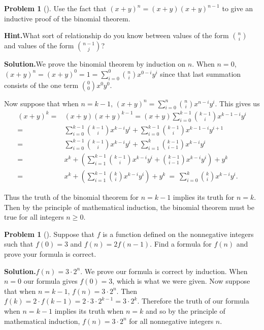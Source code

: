 \documentclass[10pt,]{book}
\theoremstyle{plain}
\theoremstyle{definition}
\newtheorem{activity}[project]{Problem}
\theoremstyle{definition}
\numberwithin{equation}{chapter}
\newcommand{\amp}{&}
\begin{document}
\begin{activity}[]\label{activity-73}
Use the fact that \((x+y)^n = (x+y)(x+y)^{n-1}\) to give an inductive proof of the binomial theorem.%
\par\medskip\noindent%
\textbf{Hint.}\quad What sort of relationship do you know between values of the form \(\binom{n}{i}\) and values of the form \(\binom{n-1}{j}\)?%
\par\medskip\noindent%
\textbf{Solution.}\quad We prove the binomial theorem by induction on \(n\). When \(n=0\), \((x+y)^n=(x+y)^0=1=\sum_{i=0}^0 \binom{n}{i}x^{0-i}y^i\) since that last summation consists of the one term \(\binom{0}{0}x^0y^0\).%
\par
Now suppose that when \(n=k-1\), \((x+y)^n=\sum_{i=0}^n \binom{n}{i}x^{n-i}y^i.\) This gives us%
\begin{align*}
(x+y)^k =\amp (x+y)(x+y)^{k-1}=(x+y)\sum_{i=0}^{k-1}\binom{k-1}{i}x^{k-1-i}y^i\\
=\amp \sum_{i=0}^{k-1}\binom{k-1}{i}x^{k-i}y^i+\sum_{i=0}^{k-1} \binom{k-1}{i}x^{k-1-i}y^{i+1}\\
=\amp \sum_{i=0}^{k-1}\binom{k-1}{i}x^{k-i}y^i+\sum_{i=1}^{k} \binom{k-1}{i-1}x^{k-i}y^{i}\\
=\amp  x^k+\left(\sum_{i=1}^{k-1}\binom{k-1}{i}x^{k-i}y^i+\binom{k-1}{i-1}x^{k-i}y^i\right) +y^k\\
=\amp  x^k+\left(\sum_{i=1}^{k-1} \binom{k}{i}x^{k-i}y^i\right) +y^k\ =\
\sum_{i=0}^k \binom{k}{i}x^{k-i}y^i.
\end{align*}
%
\par
Thus the truth of the binomial theorem for \(n=k-1\) implies its truth for \(n=k\). Then by the principle of mathematical induction, the binomial theorem must be true for all integers \(n\ge 0\).%
\end{activity}
\begin{activity}[]\label{activity-74}
Suppose that \(f\) is a function defined on the nonnegative integers such that \(f(0)=3\) and \(f(n)=2f(n-1)\). Find a formula for \(f(n)\) and prove your formula is correct.%
\par\medskip\noindent%
\textbf{Solution.}\quad \(f(n)=3\cdot2^n\). We prove our formula is correct by induction. When \(n=0\) our formula gives \(f(0)=3\), which is what we were given. Now suppose that when \(n=k-1\), \(f(n) =3\cdot2^n\). Then \(f(k)=2\cdot  f(k-1) =2\cdot 3\cdot2^{k-1}=3\cdot2^k\). Therefore the truth of our formula when \(n=k-1\) implies its truth when \(n=k\) and so by the principle of mathematical induction, \(f(n)=3\cdot 2^n\) for all nonnegative integers \(n\).%
\end{activity}
\end{document}
